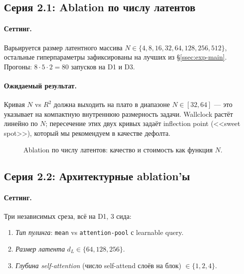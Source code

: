 \subsection{Серия 2.1: Ablation по числу латентов}
\label{ssec:exp-numlatents}

\paragraph{Сеттинг.} Варьируется размер латентного массива $N \in \{4, 8, 16, 32, 64, 128, 256, 512\}$, остальные гиперпараметры зафиксированы на лучших из §\ref{ssec:exp-main}. Прогоны: $8 \cdot 5 \cdot 2 = 80$ запусков на D1 и D3.

\paragraph{Ожидаемый результат.} Кривая $N$ vs $R^2$ должна выходить на плато в диапазоне $N \in [32, 64]$ --- это указывает на компактную внутреннюю размерность задачи. Wallclock растёт линейно по $N$; пересечение этих двух кривых задаёт inflection point (<<sweet spot>>), который мы рекомендуем в качестве дефолта.

\begin{figure}[ht]
\centering
{}
\caption{Ablation по числу латентов: качество и стоимость как функция $N$.}
\label{fig:latent-ablation}
\end{figure}

\subsection{Серия 2.2: Архитектурные ablation'ы}
\label{ssec:exp-arch}

\paragraph{Сеттинг.} Три независимых среза, всё на D1, $3$ сида:
\begin{enumerate}
    \item \emph{Тип пулинга}: \texttt{mean} vs \texttt{attention-pool} с learnable query.
    \item \emph{Размер латента} $d_L \in \{64, 128, 256\}$.
    \item \emph{Глубина self-attention} (число self-attend слоёв на блок) $\in \{1, 2, 4\}$.
\end{enumerate}

